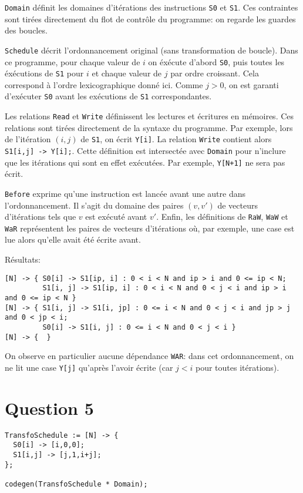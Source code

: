 \documentclass{article}
\begin{document}
\lstinline{Domain} définit les domaines d'itérations des instructions \lstinline{S0} et \lstinline{S1}.
Ces contraintes sont tirées directement du flot de contrôle du programme: on regarde les guardes des boucles.

\lstinline{Schedule} décrit l'ordonnancement original (sans transformation de boucle).
Dans ce programme, pour chaque valeur de $i$ on éxécute d'abord \lstinline{S0}, puis toutes les éxécutions de \lstinline{S1} pour $i$ et chaque valeur de $j$ par ordre croissant.
Cela correspond à l'ordre lexicographique donné ici. Comme $j>0$, on est garanti d'exécuter \lstinline{S0} avant les exécutions de \lstinline{S1} correspondantes.

Les relations \lstinline{Read} et \lstinline{Write} définissent les lectures et écritures en mémoires.
Ces relations sont tirées directement de la syntaxe du programme.
Par exemple, lors de l'itération $(i,j)$ de \lstinline{S1}, on écrit \lstinline{Y[i]}.
La relation \lstinline{Write} contient alors \lstinline{ S1[i,j] -> Y[i];}.
Cette définition est intersectée avec \lstinline{Domain} pour n'inclure que les itérations qui sont en effet exécutées. Par exemple, \lstinline{Y[N+1]} ne sera pas écrit.

\lstinline{Before} exprime qu'une instruction est lancée avant une autre dans l'ordonnancement.
Il s'agit du domaine des paires $(v,v')$ de vecteurs d'itérations tels que $v$ est exécuté avant $v'$.
Enfin, les définitions de \lstinline{RaW}, \lstinline{WaW} et \lstinline{WaR} représentent les paires de vecteurs d'itérations où, par exemple, une case est lue alors qu'elle avait été écrite avant.

Résultats:
\begin{lstlisting}
[N] -> { S0[i] -> S1[ip, i] : 0 < i < N and ip > i and 0 <= ip < N;
         S1[i, j] -> S1[ip, i] : 0 < i < N and 0 < j < i and ip > i and 0 <= ip < N }
[N] -> { S1[i, j] -> S1[i, jp] : 0 <= i < N and 0 < j < i and jp > j and 0 < jp < i;
         S0[i] -> S1[i, j] : 0 <= i < N and 0 < j < i }
[N] -> {  }
\end{lstlisting}

On observe en particulier aucune dépendance \lstinline{WAR}: dans cet ordonnancement, on ne lit une case \lstinline{Y[j]} qu'après l'avoir écrite (car $j<i$ pour toutes itérations).

\section*{Question 5}
\begin{lstlisting}
TransfoSchedule := [N] -> {
  S0[i] -> [i,0,0];
  S1[i,j] -> [j,1,i+j];
};

codegen(TransfoSchedule * Domain);
\end{lstlisting}
\end{document}
